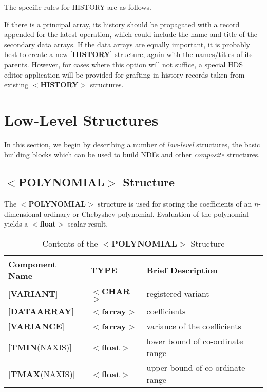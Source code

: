 \documentclass[twoside,11pt]{article}
\newcommand{\xlabel}[1]{}
\renewcommand{\_}{\texttt{\symbol{95}}}
\begin{document}
The specific rules for HISTORY are as follows.

If there is a principal array, its history should be propagated with
a record appended for the latest operation, which could include the
name and title of the secondary data arrays.  If the data arrays are
equally important, it is probably best
to create a new {[}{\bf HISTORY}{]} structure,
again with the names/titles of its parents.  However, for cases
where this option will not suffice, a special
HDS editor application will be provided for grafting
in history records taken from
existing $<${\bf HISTORY}$>$ structures.

\section{\xlabel{se_basic}Low-Level Structures\label{se:basic}}

In this section, we begin by describing a number of
{\it low-level} structures, the basic building blocks which
can be used to build NDFs and other {\it composite} structures.

\subsection{\xlabel{se_polynomial}$<${\bf POLYNOMIAL}$>$ Structure\label{se:spolynomial}}

The $<${\bf POLYNOMIAL}$>$ structure is used for storing the coefficients of an
$n$-dimensional ordinary or Chebyshev polynomial.  Evaluation of
the polynomial yields a $<${\bf float}$>$ scalar result.

\begin{table}[hbt]
\centering
\caption{Contents of the $<${\bf POLYNOMIAL}$>$ Structure}
\begin{tabular}{|l|l|l|}
\hline
Component Name & TYPE & Brief Description \\ \hline
{[}{\bf VARIANT}{]} & $<${\bf \_CHAR}$>$ & registered variant \\
{[}{\bf DATA\_ARRAY}{]} & $<${\bf farray}$>$ & coefficients \\
{[}{\bf VARIANCE}{]}  & $<${\bf farray}$>$ & variance of the coefficients \\
{[}{\bf TMIN}(NAXIS){]} & $<${\bf float}$>$ & lower bound of co-ordinate range\\
{[}{\bf TMAX}(NAXIS){]} & $<${\bf float}$>$ & upper bound of co-ordinate range\\ \hline
\end{tabular}
\end{table}
\end{document}

